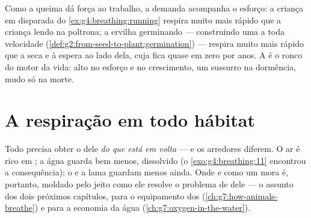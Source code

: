 \begin{example}\label{ex:g7:what-is-respiration:demand}
Como a queima dá força ao trabalho, a demanda acompanha o esforço: a
criança em disparada do \cref{ex:g4:breathing:running} respira muito
mais rápido que a criança lendo na poltrona; a ervilha germinando ---
construindo uma  a toda velocidade
(\cref{def:g2:from-seed-to-plant:germination}) --- respira muito mais
rápido que a  seca e à espera ao lado dela, cuja 
fica quase em zero por anos. A  é o ronco do motor da vida:
alto no esforço e no crescimento, um sussurro na dormência, mudo só na
morte.
\end{example}

\section{A respiração em todo hábitat}

\begin{proposition}\label{prop:g7:what-is-respiration:habitats}
Todo  precisa obter o  dele \emph{do que está em volta}
--- e os arredores diferem. O ar é rico em ; a água guarda bem
menos, dissolvido (o \cref{exo:g4:breathing:11} encontrou a
consequência); o  e a lama guardam menos ainda. Onde e como um  mora é, portanto, moldado pelo jeito como ele resolve o problema
de  dele --- o assunto dos dois próximos capítulos, para o
equipamento dos  (\cref{ch:g7:how-animals-breathe}) e para a
economia da água (\cref{ch:g7:oxygen-in-the-water}).
\end{proposition}
\admitted

